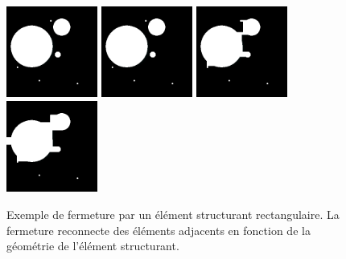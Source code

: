 \begin{figure}[h]
  \centering
  \includegraphics[height=3cm]{Images/morpho_init.png}
  \includegraphics[height=3cm]{Images/morpho_close_k5.png}
  \includegraphics[height=3cm]{Images/morpho_close_k21.png}
  \includegraphics[height=3cm]{Images/morpho_close_k31.png}
  \caption{Exemple de fermeture par un élément structurant rectangulaire. La fermeture reconnecte des éléments adjacents en fonction de la géométrie de l'élément structurant.}
  \label{fig:morpho_femerture}
\end{figure}

